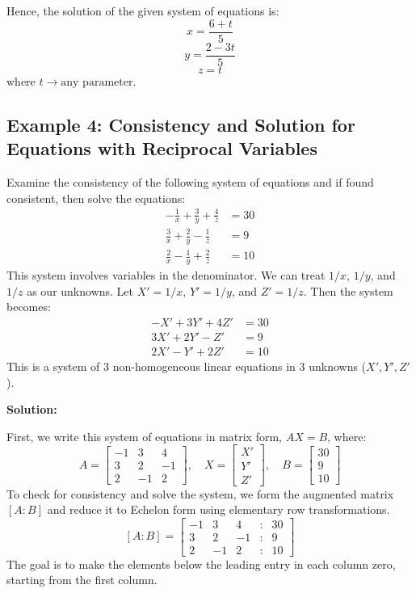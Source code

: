 \documentclass{article}
\begin{document}
Hence, the solution of the given system of equations is:
\[ x = \frac{6 + t}{5} \]
\[ y = \frac{2 - 3t}{5} \]
\[ z = t \]
where $t \to \text{any parameter}$.

\subsection{Example 4: Consistency and Solution for Equations with Reciprocal Variables} %
Examine the consistency of the following system of equations and if found consistent, then solve the equations:
\begin{align*} -\frac{1}{x} + \frac{3}{y} + \frac{4}{z} &= 30 \\ \frac{3}{x} + \frac{2}{y} - \frac{1}{z} &= 9 \\ \frac{2}{x} - \frac{1}{y} + \frac{2}{z} &= 10 \end{align*}
This system involves variables in the denominator. We can treat $1/x$, $1/y$, and $1/z$ as our unknowns. Let $X' = 1/x$, $Y' = 1/y$, and $Z' = 1/z$. Then the system becomes:
\begin{align*} -X' + 3Y' + 4Z' &= 30 \\ 3X' + 2Y' - Z' &= 9 \\ 2X' - Y' + 2Z' &= 10 \end{align*}
This is a system of 3 non-homogeneous linear equations in 3 unknowns ($X', Y', Z'$).

\textbf{Solution:}

First, we write this system of equations in matrix form, $AX = B$, where:
\[ A = \begin{bmatrix} -1 & 3 & 4 \\ 3 & 2 & -1 \\ 2 & -1 & 2 \end{bmatrix}, \quad X = \begin{bmatrix} X' \\ Y' \\ Z' \end{bmatrix}, \quad B = \begin{bmatrix} 30 \\ 9 \\ 10 \end{bmatrix} \]
To check for consistency and solve the system, we form the augmented matrix $[A:B]$ and reduce it to Echelon form using elementary row transformations.
\[ [A:B] = \begin{bmatrix} -1 & 3 & 4 & : & 30 \\ 3 & 2 & -1 & : & 9 \\ 2 & -1 & 2 & : & 10 \end{bmatrix} \]
The goal is to make the elements below the leading entry in each column zero, starting from the first column.
\end{document}
